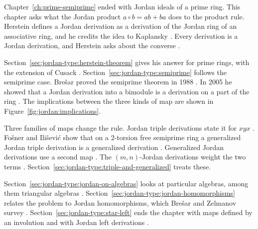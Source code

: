 
Chapter~\ref{ch:prime-semiprime} ended with Jordan ideals of a prime ring. This chapter asks what the
Jordan product $a\circ b=ab+ba$ does to the product rule. Herstein defines a Jordan derivation as a
derivation of the Jordan ring of an associative ring, and he credits the idea to Kaplansky
\cite[p.~1104]{Herstein1957}. Every derivation is a Jordan derivation, and Herstein asks about the
converse \cite[p.~1104]{Herstein1957}.

Section~\ref{sec:jordan-type:herstein-theorem} gives his answer for prime rings, with the extension
of Cusack \cite[p.~323]{Cusack1975}. Section~\ref{sec:jordan-type:semiprime} follows the semiprime
case. Brešar proved the semiprime theorem in 1988 \cite[p.~1003]{Bresar1988}. In 2005 he showed
that a Jordan derivation into a bimodule is a derivation on a part of the ring
\cite[p.~411]{Bresar2005}. The implications between the three kinds of map are shown in
Figure~\ref{fig:jordan:implications}.

Three families of maps change the rule. Jordan triple derivations state it for $xyx$
\cite[p.~416]{FosnerIlisevic2008}. Fošner and Ilišević show that on a $2$-torsion free semiprime ring a
generalized Jordan triple derivation is a generalized derivation
\cite[Corollary~4.2, p.~424]{FosnerIlisevic2008}. Generalized Jordan derivations use a second map
\cite[p.~1]{FerreiraGuzzoFerreira2020}. The $(m,n)$-Jordan derivations weight the two terms
\cite[p.~1881]{MajeedOzel2014}. Section~\ref{sec:jordan-type:triple-and-generalized} treats these.

Section~\ref{sec:jordan-type:jordan-on-algebras} looks at particular algebras, among them triangular
algebras \cite[p.~1]{ChengJing2007}. Section~\ref{sec:jordan-type:jordan-homomorphisms} relates the
problem to Jordan homomorphisms, which Brešar and Zelmanov survey \cite[p.~203]{BresarZelmanov2025}.
Section~\ref{sec:jordan-type:star-left} ends the chapter with maps defined by an involution
\cite[p.~416]{FosnerIlisevic2008} and with Jordan left derivations \cite[p.~1]{Vukman1997}.

